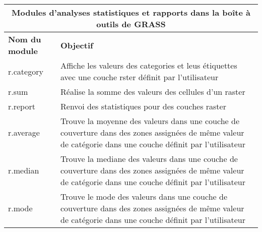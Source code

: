 \vspace{-1cm}

\begin{table}[H]
\centering
 \begin{tabular}{|p{4cm}|p{10cm}|}
   \hline \multicolumn{2}{|c|}{\textbf{Modules d'analyses statistiques et rapports dans la boîte à outils de GRASS}} \\
  \hline \textbf{Nom du module} & \textbf{Objectif} \\
  \hline r.category & Affiche les valeurs des categories et leus étiquettes avec une couche rster définit par l'utilisateur \\
  \hline r.sum & Réalise la somme des valeurs des cellules d'un raster \\
  \hline r.report & Renvoi des statistiques pour des couches raster \\
  \hline r.average & Trouve la moyenne des valeurs dans une couche de couverture dans des zones assignées de m\^eme valeur de catégorie dans une couche définit par l'utilisateur \\
  \hline r.median & Trouve la mediane des valeurs dans une couche de couverture dans des zones assignées de m\^eme valeur de catégorie dans une couche définit par l'utilisateur \\
  \hline r.mode & Trouve le mode des valeurs dans une couche de couverture dans des zones assignées de m\^eme valeur de catégorie  dans une couche définit par l'utilisateur \\

\end{tabular}
\end{table}
